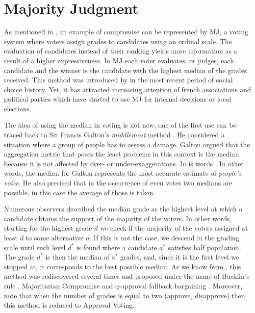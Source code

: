 \newpage
\section{Majority Judgment}
\label{sec:litMJ}

As mentioned in , an example of compromise can be represented by \acl{MJ}, a voting system where voters assign grades to candidates using an ordinal scale. The evaluation of candidates instead of their ranking yields more information as a result of a higher expressiveness.
In \ac{MJ} each voter evaluates, or judges, each candidate and the winner is the candidate with the highest median of the grades received. 
This method was introduced by \citet{Balinski2007} in the most recent period of social choice history. Yet, it has attracted increasing attention of french associations and political parties which have started to use \ac{MJ} for internal decisions or local elections. 

The idea of using the median in voting is not new, one of the first use can be traced back to Sir Francis Galton's \textit{middlemost} method \citep{Galton1907a,Galton1907b}. He considered a situation where a group of people has to assess a damage. Galton argued that the aggregation metric that poses the least problems in this context is the median because it is not affected by over- or under-exaggerations. In is words . In other words, the median for Galton represents the most accurate estimate of \textit{people's voice}. He also precised that in the occurrence of even votes two medians are possible, in this case the average of those is taken.

Numerous observers described the median grade as the highest level at which a candidate obtains the support of the majority of the voters. In other words, starting for the highest grade $d$ we check if the majority of the voters assigned at least $d$ to some alternative $a$. If this is not the case, we descend in the grading scale until such level $d^*$ is found where a candidate $a^*$ satisfies half population. The grade $d^*$ is then the median of $a^*$ grades, and, since it is the first level we stopped at, it corresponds to the best possible median. As we know from , this method was rediscovered several times and proposed under the name of Bucklin's rule \citep{Hoag1926}, Majoritarian Compromise \citep{Sertel1986,Sertel1999} and q-approval fallback bargaining \citep{Brams2001}. Moreover, note that when the number of grades is equal to two (approve, disapprove) then this method is reduced to Approval Voting.


